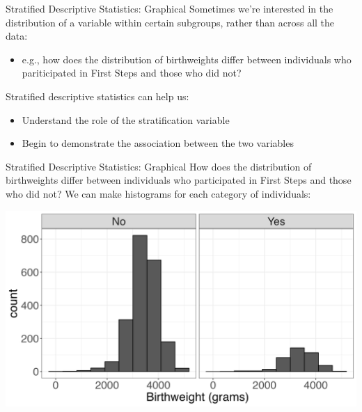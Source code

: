 \documentclass[
  ignorenonframetext,
]{beamer}
\providecommand{\tightlist}{%
  \setlength{\itemsep}{0pt}\setlength{\parskip}{0pt}}
\begin{document}
\begin{frame}{Stratified Descriptive Statistics: Graphical}
\protect\hypertarget{stratified-descriptive-statistics-graphical}{}
Sometimes we're interested in the distribution of a variable within
certain subgroups, rather than across all the data:

\begin{itemize}
\tightlist
\item
  e.g., how does the distribution of birthweights differ between
  individuals who pariticipated in First Steps and those who did not?
\end{itemize}

Stratified descriptive statistics can help us:

\begin{itemize}
\tightlist
\item
  Understand the role of the stratification variable
\item
  Begin to demonstrate the association between the two variables
\end{itemize}
\end{frame}

\begin{frame}{Stratified Descriptive Statistics: Graphical}
\protect\hypertarget{stratified-descriptive-statistics-graphical-1}{}
How does the distribution of birthweights differ between individuals who
participated in First Steps and those who did not? We can make
histograms for each category of individuals:

\includegraphics{fs_hist_firstep.png}
\end{frame}
\end{document}
